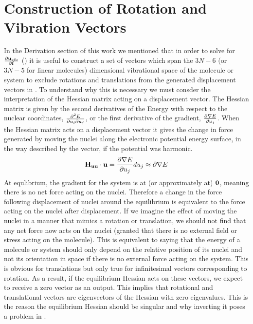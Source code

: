 \section{Construction of Rotation and Vibration Vectors}
In the Derivation section of this work we mentioned that in order to solve for ${\frac{\partial {\ensuremath{\bf{u}}}_{\mathrm{vib}}}{\partial {\ensuremath{\bf{f}}}}}$ () it is useful to construct a set of vectors 
which span the $3N-6$ (or $3N-5$ for linear molecules) dimensional vibrational space of the molecule or system to exclude rotations and translations from the generated displacement vectors 
in .  
To understand why this is necessary we must consder the interpretation of the Hessian matrix acting on a displacement vector.  
The Hessian matrix is given by the second derivatives
of the Energy with respect to the nuclear coordinates, ${\frac{\partial^2 E}{\partial u_i \partial u_j}}$, or the first derivative of the gradient, ${\frac{\partial \nabla E}{\partial u_j}}$. 
When the Hessian matrix acts on a displacement vector it gives the change in force generated by moving the nuclei along the electronic potential energy surface, in the way described by the vector, if the potential was harmonic. 
\begin{equation}
 {\bf{H_{uu}}}\cdot{\bf{u}}={\frac{\partial \nabla E}{\partial u_j}}{du_j}\approx \partial \nabla E 
\end{equation}
At equlibrium, the gradient for the system is at (or approximately at) ${\bf{0}}$, meaning there is no net force acting on the nuclei. 
Therefore a change in the force following displacement of nuclei around the equilibrium is equivalent to the force acting on the nuclei after displacement.  
If we imagine the effect of moving the nuclei in a manner that mimics a rotation or translation, we should not find that any net force now acts on the nuclei (granted that there is no external field or stress acting on the molecule).
This is equivalent to saying that the energy of a molecule or system should only depend on the relative position of its nuclei and not its orientation in space if there
is no external force acting on the system.  
This is obvious for translations but only true for infinitesimal vectors corresponding to rotation.  
As a result, if the equilibrium Hessian acts on these vectors, we expect to 
receive a zero vector as an output.  
This implies that rotational and translational vectors are eigenvectors of the Hessian with zero eigenvalues.  
This is the reason the equilibrium 
Hessian should be singular and why inverting it poses a problem in .  

